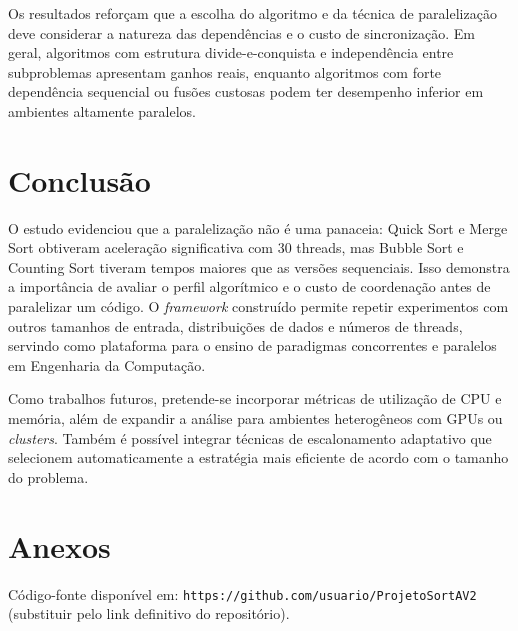 \documentclass[11pt,twoside,a4paper]{article}
\begin{document}
\par Os resultados reforçam que a escolha do algoritmo e da técnica de paralelização deve considerar a natureza das dependências e o custo de sincronização. Em geral, algoritmos com estrutura divide-e-conquista e independência entre subproblemas apresentam ganhos reais, enquanto algoritmos com forte dependência sequencial ou fusões custosas podem ter desempenho inferior em ambientes altamente paralelos.

\section{Conclusão}
\par O estudo evidenciou que a paralelização não é uma panaceia: Quick Sort e Merge Sort obtiveram aceleração significativa com 30 threads, mas Bubble Sort e Counting Sort tiveram tempos maiores que as versões sequenciais. Isso demonstra a importância de avaliar o perfil algorítmico e o custo de coordenação antes de paralelizar um código. O \textit{framework} construído permite repetir experimentos com outros tamanhos de entrada, distribuições de dados e números de threads, servindo como plataforma para o ensino de paradigmas concorrentes e paralelos em Engenharia da Computação.

\par Como trabalhos futuros, pretende-se incorporar métricas de utilização de CPU e memória, além de expandir a análise para ambientes heterogêneos com GPUs ou \textit{clusters}. Também é possível integrar técnicas de escalonamento adaptativo que selecionem automaticamente a estratégia mais eficiente de acordo com o tamanho do problema.




\section*{Anexos}
\par Código-fonte disponível em: \texttt{https://github.com/usuario/ProjetoSortAV2} (substituir pelo link definitivo do repositório).
\end{document}
